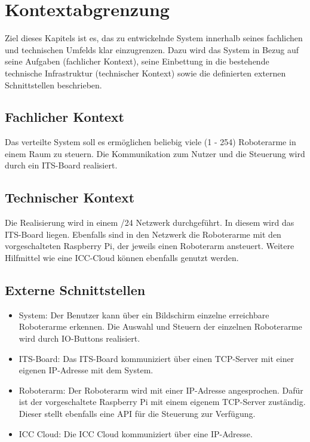 \chapter{Kontextabgrenzung}
Ziel dieses Kapitels ist es, das zu entwickelnde System innerhalb seines fachlichen und technischen Umfelds klar einzugrenzen. Dazu wird das System in Bezug auf seine Aufgaben (fachlicher Kontext), seine Einbettung in die bestehende technische Infrastruktur (technischer Kontext) sowie die definierten externen Schnittstellen beschrieben.

\section{Fachlicher Kontext}

Das verteilte System soll es ermöglichen beliebig viele (1 - 254) Roboterarme in einem Raum zu steuern. Die Kommunikation zum Nutzer und die Steuerung wird durch ein ITS-Board realisiert. 

\section{Technischer Kontext}

Die Realisierung wird in einem /24 Netzwerk durchgeführt. In diesem wird das ITS-Board liegen. Ebenfalls sind in den Netzwerk die Roboterarme mit den vorgeschalteten Raspberry Pi, der jeweils einen Roboterarm ansteuert. Weitere Hilfmittel wie eine ICC-Cloud können ebenfalls genutzt werden.

\section{Externe Schnittstellen}

\begin{itemize}
	\item{System:} Der Benutzer kann über ein Bildschirm einzelne erreichbare Roboterarme erkennen. Die Auswahl und Steuern der einzelnen Roboterarme wird durch IO-Buttons realisiert.
	
	\item{ITS-Board:} Das ITS-Board kommuniziert über einen TCP-Server mit einer eigenen IP-Adresse mit dem System.
	
	\item{Roboterarm:} Der Roboterarm wird mit einer IP-Adresse angesprochen. Dafür ist der vorgeschaltete Raspberry Pi mit einem eigenem TCP-Server zuständig. Dieser stellt ebenfalls eine API für die Steuerung zur Verfügung.  
	
	\item{ICC Cloud:} Die ICC Cloud kommuniziert über eine IP-Adresse. %
	
	
\end{itemize}